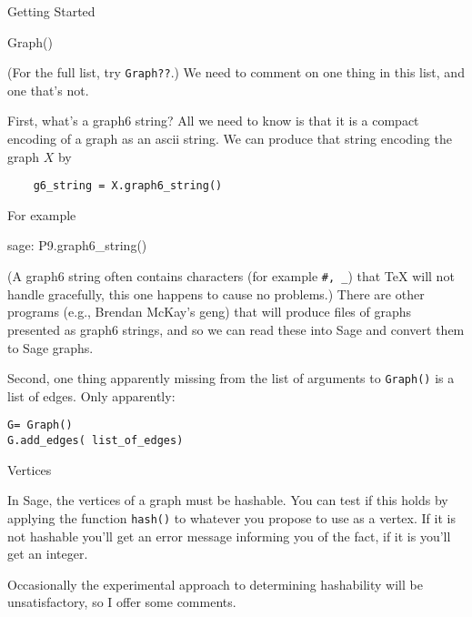 \begin{chap}{Getting Started}
\begin{sect}{Graph()}
\begin{para}
(For the full list, try \verb|Graph??|.) We need to comment on one thing in
this list, and one that's not.
\end{para}
%
\begin{para}
First, what's a graph6 string? All we need to know is that it is a compact
encoding of a graph as an ascii string.  We can produce that string encoding
the graph $X$ by
\end{para}
%
\begin{verbatim}
    g6_string = X.graph6_string()
\end{verbatim}
%
\begin{para}
For example
\end{para}
%
\begin{sageexample}
    sage: P9.graph6_string()
\end{sageexample}
%
\begin{para}
(A graph6 string often contains characters (for example \verb|#, _|) that \TeX{} 
will not handle gracefully, this one happens to cause no problems.)
There are other programs (e.g., Brendan McKay's geng) that will produce files of
graphs presented as graph6 strings, and so we can read these into
Sage and convert them to Sage graphs. 
\end{para}
%
\begin{para}
\end{para}
%
\begin{para}
Second, one thing apparently missing from the list of arguments to \verb|Graph()| is
a list of edges. Only apparently:
\end{para}
%
\begin{verbatim}
G= Graph()
G.add_edges( list_of_edges)
\end{verbatim}
%
\end{sect}
%
\begin{sect}{Vertices}
%
\begin{para}
In Sage, the vertices of a graph must be hashable. You can test if this holds 
by applying the function \verb|hash()| to whatever you propose to use as a vertex.
If it is not hashable you'll get an error message informing you of the fact, if it
is you'll get an integer.
\end{para}
%
\begin{para}
Occasionally the experimental approach to determining hashability will be 
unsatisfactory, so I offer some comments.
\end{para}
%
\begin{para}

\end{para}
\end{sect}
\end{chap}
